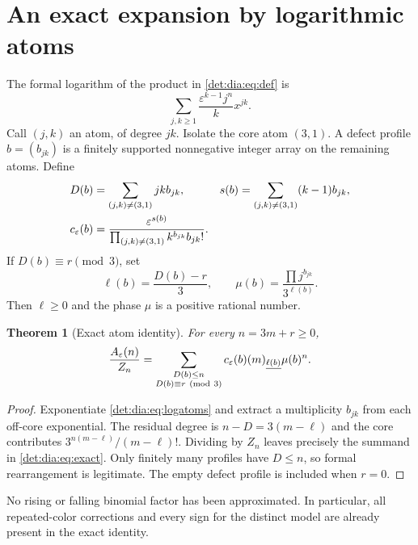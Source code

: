 \documentclass[11pt,letterpaper]{article}
\numberwithin{equation}{section}
\newtheorem{theorem}{Theorem}[section]
\theoremstyle{definition}\newtheorem{definition}[theorem]{Definition}
\theoremstyle{remark}\newtheorem{remark}[theorem]{Remark}
\newcommand{\fall}[2]{(#1)_{\underline{#2}}}
\newcommand{\eps}{\varepsilon}
\begin{document}
\section{An exact expansion by logarithmic atoms}
The formal logarithm of the product in \eqref{det:dia:eq:def} is
\begin{equation}\label{det:dia:eq:logatoms}
 \sum_{j,k\geq1}\frac{\eps^{k-1}j^n}{k}x^{jk}.
\end{equation}
Call $(j,k)$ an atom, of degree $jk$. Isolate the core atom $(3,1)$.
A defect profile $b=(b_{jk})$ is a finitely supported nonnegative integer
array on the remaining atoms. Define
\begin{align}
 D(b)&=\sum_{(j,k)\ne(3,1)}jk b_{jk},&
 s(b)&=\sum_{(j,k)\ne(3,1)}(k-1)b_{jk},\label{det:dia:eq:bc}\\
 c_\eps(b)&=\frac{\eps^{s(b)}}{\prod_{(j,k)\ne(3,1)}k^{b_{jk}}b_{jk}!}.
 \notag
\end{align}
If $D(b)\equiv r\pmod3$, set
\begin{equation}\label{det:dia:eq:phase}
 \ell(b)=\frac{D(b)-r}{3},\qquad
 \mu(b)=\frac{\prod j^{b_{jk}}}{3^{\ell(b)}}.
\end{equation}
Then $\ell\geq0$ and the phase $\mu$ is a positive rational number.

\begin{theorem}[Exact atom identity]\label{det:dia:thm:exact}
For every $n=3m+r\geq0$,
\begin{equation}\label{det:dia:eq:exact}
 \frac{A_\eps(n)}{Z_n}=
 \sum_{\substack{D(b)\leq n\\D(b)\equiv r\ ({\rm mod}\ 3)}}
 c_\eps(b)\fall{m}{\ell(b)}\mu(b)^n.
\end{equation}
\end{theorem}
\begin{proof}
Exponentiate \eqref{det:dia:eq:logatoms} and extract a multiplicity $b_{jk}$
from each off-core exponential. The residual degree is
$n-D=3(m-\ell)$ and the core contributes
$3^{n(m-\ell)}/(m-\ell)!$. Dividing by $Z_n$ leaves precisely the
summand in \eqref{det:dia:eq:exact}. Only finitely many profiles have $D\leq n$,
so formal rearrangement is legitimate. The empty defect profile is
included when $r=0$.
\end{proof}
No rising or falling binomial factor has been approximated. In
particular, all repeated-color corrections and every sign for the
distinct model are already present in the exact identity.
\end{document}
